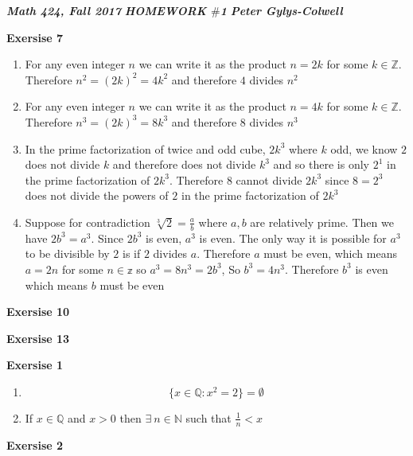 \documentclass[12pt]{article}
\newcounter{ques}[section]
\newenvironment{ques}[1]{\textbf{Exersise #1} \vspace{1mm}}{\medskip}
\theoremstyle{definition}
\begin{document}
\noindent \textit{\textbf{Math 424, Fall 2017}} \hspace{1.3cm}
\textit{\textbf{HOMEWORK $\#$1}} \hspace{1.3cm} \textit{\textbf{Peter
Gylys-Colwell}} 

\vspace{1cm}

\begin{ques}{7}
	\begin{enumerate}
		\item
			For any even integer $n$ we can write it as the product
			$n = 2k$ for some $k \in \mathbb{Z}$. Therefore $n^2 =
			(2k)^2 = 4k^2$ and therefore $4$ divides $n^2$

		\item
			For any even integer $n$ we can write it as the product
			$n = 4k$ for some $k \in \mathbb{Z}$. Therefore $n^3 =
			(2k)^3 = 8k^3$ and therefore $8$ divides $n^3$

		\item
			In the prime factorization of twice and odd cube,
			$2k^3$ where $k$ odd, we know $2$ does not divide $k$
			and therefore does not divide $k^3$ and so there is
			only $2^1$ in the prime factorization of $2k^3$.
			Therefore $8$ cannot divide $2k^3$ since $8 = 2^3$ does
			not divide the powers of $2$ in the prime factorization
			of $2k^3$

		\item
			Suppose for contradiction $\sqrt[3]{2} = \frac a b$
			where $a,b$ are relatively prime. Then we have $2b^3 =
			a^3$. Since $2b^3$ is even, $a^3$ is even. The only way
			it is possible for $a^3$ to be divisible by $2$ is if
			$2$ divides $a$. Therefore $a$ must be even, which
			means $a = 2n$ for some $n \in \mathbb z$ so $a^3 =
			8n^3 = 2b^3$, So $b^3 = 4n^3$. Therefore $b^3$ is even
			which means $b$ must be even
	\end{enumerate}

\end{ques}

\begin{ques}{10}
\end{ques}

\begin{ques}{13}
\end{ques}

\begin{ques}{1}
	\begin{enumerate}
		\item
			$$\{x \in \mathbb Q: x^2 = 2\} = \emptyset$$
		\item
			If $x \in \mathbb Q$ and $x > 0$ then $\exists \ n \in
			\mathbb N$ such that $\frac 1 n < x$

	\end{enumerate}
\end{ques}

\begin{ques}{2}
\end{ques}
\end{document}
